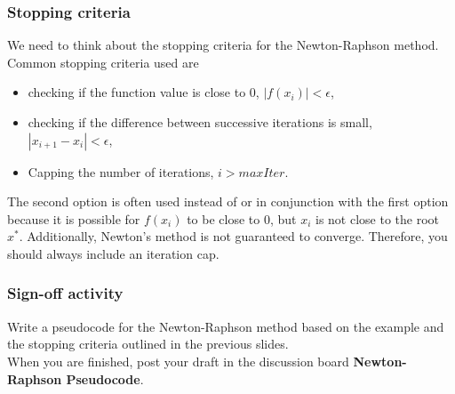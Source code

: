 \documentclass{if-beamer}
\begin{document}
\begin{frame}
\frametitle{Stopping criteria}
We need to think about the stopping criteria for the Newton-Raphson method. Common stopping criteria used are 
\begin{itemize}
	\item checking if the function value is close to $0$, $|f(x_i)|< \epsilon$,
	\item checking if the difference between successive iterations is small, $|x_{i+1}-x_i| <\epsilon$,
	\item Capping the number of iterations, $i > maxIter$. 
\end{itemize}
The second option is often used instead of or in conjunction with the first option because it is possible for $f(x_i)$ to be close to $0$, but $x_i$ is not close to the root $x^*$. Additionally, Newton's method is not guaranteed to converge. Therefore, you should always include an iteration cap.
\end{frame}

\begin{frame}
\frametitle{Sign-off activity}
Write a pseudocode for the Newton-Raphson method based on the example and the stopping criteria outlined in the previous slides.
\\\vspace{10pt} 
When you are finished, post your draft in the discussion board \textbf{Newton-Raphson Pseudocode}. 
\end{frame}
\end{document}
